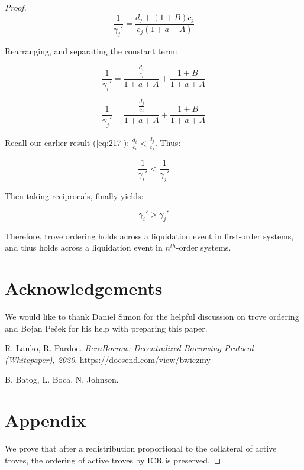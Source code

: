 \documentclass[reqno]{article}
\begin{document}
\begin{proof}
\begin{equation} 
    \frac{1}{\gamma_{j}'}=\frac{d_j+\left(1+B\right)c_j}{c_j\left(1+a+A\right)}
\end{equation}

\bigskip
Rearranging, and separating the constant term:

\begin{equation} 
    \frac{1}{\gamma_{i}'}=\frac{\frac{d_i}{c_i}}{1+a+A}+\frac{1+B}{1+a+A}
\end{equation}

\begin{equation} 
    \frac{1}{\gamma_{j}'}=\frac{\frac{d_j}{c_j}}{1+a+A}+\frac{1+B}{1+a+A}
\end{equation}

\bigskip
Recall our earlier result (\ref{eq:217}): $\frac{d_i}{c_i}<\frac{d_j}{c_j}$. Thus:

\begin{equation} 
    \frac{1}{\gamma_{i}'} < \frac{1}{\gamma_{j}'}
\end{equation}

\bigskip
Then taking reciprocals, finally yields:

\begin{equation} 
    \gamma_{i}' > \gamma_{j}'
\end{equation}

\bigskip
Therefore, trove ordering holds across a liquidation event in first-order systems, and thus holds across a liquidation event in $n^{th}$-order systems.

\bigskip

\section{Acknowledgements}
We would like to thank Daniel Simon for the helpful discussion on trove ordering and Bojan Peček for his help with preparing this paper.

\begin{thebibliography}{9}

R. Lauko, R. Pardoe. 
\textit{BeraBorrow: Decentralized Borrowing Protocol (Whitepaper), 2020}. 
https://docsend.com/view/bwiczmy

B. Batog, L. Boca, N. Johnson.

\end{thebibliography}

\pagebreak
\appendix
\section{Appendix} \label{sec:appendix}
We prove that after a redistribution proportional to the collateral of active troves, the ordering of active troves by ICR is preserved. 


\end{proof}
\end{document}
